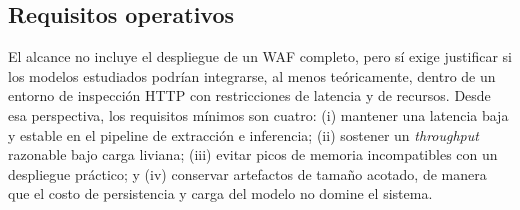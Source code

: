 \documentclass[12pt,oneside]{report}
\begin{document}
\subsection{Requisitos operativos}
El alcance no incluye el despliegue de un WAF completo, pero sí exige justificar si los modelos estudiados podrían integrarse, al menos teóricamente, dentro de un entorno de inspección HTTP con restricciones de latencia y de recursos. Desde esa perspectiva, los requisitos mínimos son cuatro: (i) mantener una latencia baja y estable en el pipeline de extracción e inferencia; (ii) sostener un \textit{throughput} razonable bajo carga liviana; (iii) evitar picos de memoria incompatibles con un despliegue práctico; y (iv) conservar artefactos de tamaño acotado, de manera que el costo de persistencia y carga del modelo no domine el sistema.\
\end{document}
